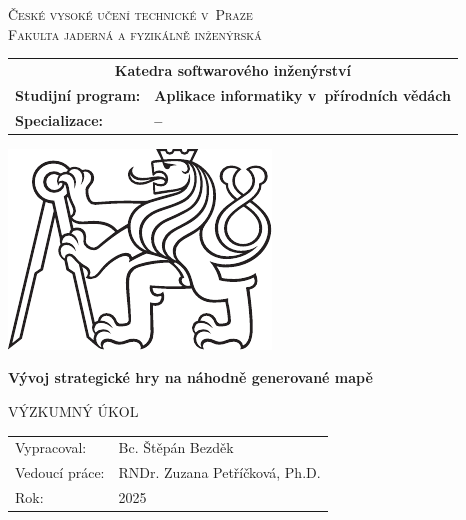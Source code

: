 \documentclass[a4paper,oneside,12pt]{book} %
\newcommand{\tb}{\textbf} %
\newcommand{\cvut}{České vysoké učení technické v~Praze}
\newcommand{\fjfi}{Fakulta jaderná a fyzikálně inženýrská}
\newcommand{\ksi}{Katedra softwarového inženýrství}
\newcommand{\program}{Aplikace informatiky v~přírodních vědách} %
\newcommand{\specializace}{--} %
\newcommand{\druh}{Výzkumný úkol} %
\newcommand{\woman}{} %
\newcommand{\logoCVUT}{\includegraphics{symbol_cvut_konturova_verze_cb.pdf}} %
\newcommand{\nazevcz}{Vývoj strategické hry na náhodně generované mapě}    %
\newcommand{\autor}{Bc. Štěpán Bezděk}   %
\newcommand{\vedouci}{RNDr. Zuzana Petříčková, Ph.D.} %
\newcommand{\rok}{2025}  %
\newcommand{\kde}{Praze}
\newcommand{\prohlaseni}{Prohlašuji, že jsem svůj výzkumný úkol vypracoval\woman{} samostatně a použil\woman{} jsem pouze podklady (literaturu, projekty, SW atd.) uvedené v přiloženém seznamu.} %
\begin{document}
\thispagestyle{empty}

\begin{center}
    {\Large \textsc{\cvut}\\[1.5ex] \textsc{\fjfi}}\\
    \vspace{10mm}

    \begin{tabular}{ll}
		\multicolumn{2}{c}{\tb{\ksi}} \\[8pt]   
		\tb{Studijní program:} & \tb{\program}\\
		\tb{Specializace:} & \tb{\specializace}\\
    \end{tabular}

   \vspace{13mm} \logoCVUT \vspace{15mm} 

   {\huge \tb{\nazevcz}\par}
   \vspace{5mm}   
   
   \vspace{15mm}
   {\Large \MakeUppercase{\druh}}

   \vfill
   {\large
    \begin{tabular}{ll}
    Vypracoval: & \autor\\
    Vedoucí práce: & \vedouci\\
    Rok: & \rok
    \end{tabular}
   }
\end{center}

\thispagestyle{empty} %



\newpage %
\thispagestyle{empty}  %
\end{document}
